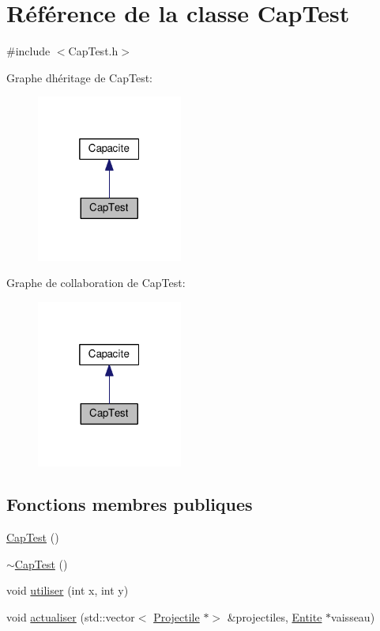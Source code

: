 \hypertarget{class_cap_test}{}\section{Référence de la classe Cap\+Test}
\label{class_cap_test}


{\ttfamily \#include $<$Cap\+Test.\+h$>$}



Graphe d\textquotesingle{}héritage de Cap\+Test\+:\nopagebreak
\begin{figure}[H]
\begin{center}
\leavevmode
\includegraphics[width=136pt]{class_cap_test__inherit__graph}
\end{center}
\end{figure}


Graphe de collaboration de Cap\+Test\+:\nopagebreak
\begin{figure}[H]
\begin{center}
\leavevmode
\includegraphics[width=136pt]{class_cap_test__coll__graph}
\end{center}
\end{figure}
\subsection*{Fonctions membres publiques}
\begin{DoxyCompactItemize}
\item 
\hyperlink{class_cap_test_a5f6d4b172a6a40f974b3f7414e3f06e5}{Cap\+Test} ()
\item 
\hyperlink{class_cap_test_a92687aa212347d1738e7736cb107d03b}{$\sim$\+Cap\+Test} ()
\item 
void \hyperlink{class_cap_test_af85984f6d9330e5527feff1a62ee4242}{utiliser} (int x, int y)
\item 
void \hyperlink{class_cap_test_a5742770894ff765e2785f82aab88b223}{actualiser} (std\+::vector$<$ \hyperlink{class_projectile}{Projectile} $\ast$$>$ \&projectiles, \hyperlink{class_entite}{Entite} $\ast$vaisseau)
\end{DoxyCompactItemize}
